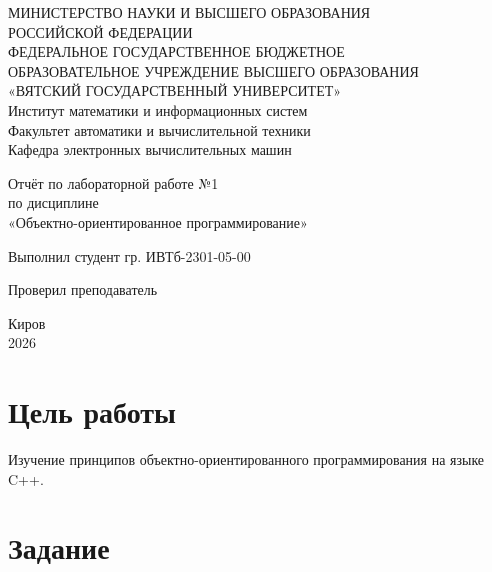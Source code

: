 \documentclass[oneside,a4paper,14pt]{extarticle}
\begin{document}
    \newpage\thispagestyle{empty}
    \begin{center}
        МИНИСТЕРСТВО НАУКИ И ВЫСШЕГО ОБРАЗОВАНИЯ\\
        РОССИЙСКОЙ ФЕДЕРАЦИИ\\
        ФЕДЕРАЛЬНОЕ ГОСУДАРСТВЕННОЕ БЮДЖЕТНОЕ\\
        ОБРАЗОВАТЕЛЬНОЕ УЧРЕЖДЕНИЕ ВЫСШЕГО ОБРАЗОВАНИЯ\\
        «ВЯТСКИЙ ГОСУДАРСТВЕННЫЙ УНИВЕРСИТЕТ»\\
        Институт математики и информационных систем\\
        Факультет автоматики и вычислительной техники\\
        Кафедра электронных вычислительных машин
    \end{center}

    \vspace{20mm}
    \begin{center}

        Отчёт по лабораторной работе №1\\
        по дисциплине\\
        «Объектно-ориентированное программирование»\\
    \end{center}
    \vfill

    Выполнил студент гр. ИВТб-2301-05-00 \hfill

    Проверил преподаватель\hfill

    \vfill
    \begin{center}
        Киров\\
        2026
    \end{center}

    \newpage
    \setcounter{page}{1}
    \tableofcontents
    \newpage

    \section*{Цель работы}
    Изучение принципов объектно-ориентированного программирования на языке C++.

    \section*{Задание}
\end{document}
